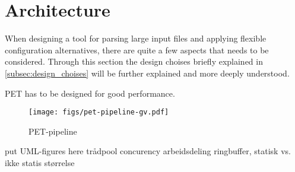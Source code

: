 \section{Architecture}
When designing a tool for parsing large input files and applying flexible configuration alternatives,
there are quite a few aspects that needs to be considered. Through this section the design choises
briefly explained in \autoref{subsec:design_choises} will be further explained and more deeply understood.

PET has to be designed for good performance.


\begin{figure}
    \texttt{[image: figs/pet-pipeline-gv.pdf]}
    \caption{PET-pipeline}
    \label{fig:pipeline}
\end{figure}

put UML-figures here
trådpool
concurency
arbeidsdeling
ringbuffer, statisk vs. ikke statis størrelse




